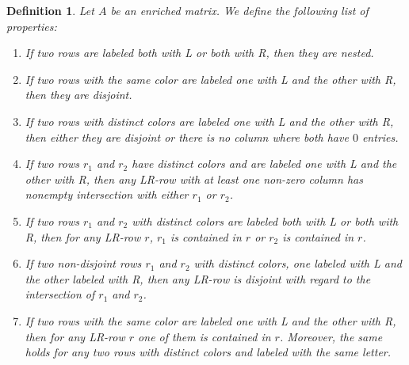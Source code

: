 \documentclass[12pt]{book}
\theoremstyle{plain}
\newtheorem{defn}[teo]{Definition}
\theoremstyle{remark}
\begin{document}
\begin{defn} \label{lista:prop_adm}
Let $A$ be an enriched matrix. We define the following list of properties: 
	\begin{enumerate}
	    \item If two rows are labeled both with L or both with R, then they are nested.  \label{item:0_def_adm}
	    
	 	\item If two rows with the same color are labeled one with L and the other with R, then they are disjoint. \label{item:1_def_adm}

	 	\item If two rows with distinct colors are labeled one with L and the other with R, then either they are disjoint or there is no column where both have $0$ entries. \label{item:2_def_adm}

		\item If two rows $r_1$ and $r_2$ have distinct colors and are labeled one with L and the other with R, then any LR-row with at least one non-zero column has nonempty intersection with either $r_1$ or $r_2$. \label{item:3_def_adm}
		
	 	\item If two rows $r_1$ and $r_2$ with distinct colors are labeled both with L or both with R, then for any LR-row $r$, $r_1$ is contained in $r$ or $r_2$ is contained in $r$. \label{item:4_def_adm}		

	
		\item If two non-disjoint rows $r_1$ and $r_2$ with distinct colors, one labeled with L and the other labeled with R, then any LR-row is disjoint with regard to the intersection of $r_1$ and $r_2$. \label{item:5_def_adm}

	
		\item If two rows with the same color are labeled one with L and the other with R, then for any LR-row $r$ one of them is contained in $r$. %
		Moreover, the same holds for any two rows with distinct colors and labeled with the same letter. \label{item:6_def_adm}
		

\end{enumerate}
\end{defn}
\end{document}
